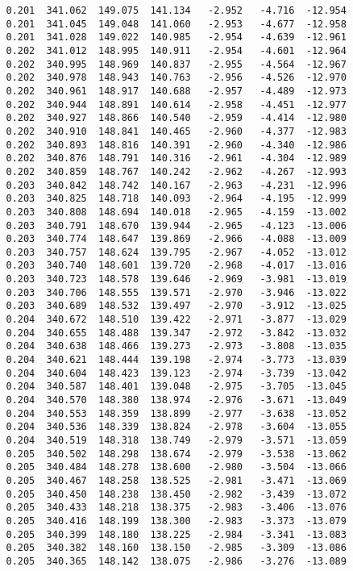 \begin{verbatim}
   0.201  341.062  149.075  141.134   -2.952   -4.716  -12.954
   0.201  341.045  149.048  141.060   -2.953   -4.677  -12.958
   0.201  341.028  149.022  140.985   -2.954   -4.639  -12.961
   0.202  341.012  148.995  140.911   -2.954   -4.601  -12.964
   0.202  340.995  148.969  140.837   -2.955   -4.564  -12.967
   0.202  340.978  148.943  140.763   -2.956   -4.526  -12.970
   0.202  340.961  148.917  140.688   -2.957   -4.489  -12.973
   0.202  340.944  148.891  140.614   -2.958   -4.451  -12.977
   0.202  340.927  148.866  140.540   -2.959   -4.414  -12.980
   0.202  340.910  148.841  140.465   -2.960   -4.377  -12.983
   0.202  340.893  148.816  140.391   -2.960   -4.340  -12.986
   0.202  340.876  148.791  140.316   -2.961   -4.304  -12.989
   0.202  340.859  148.767  140.242   -2.962   -4.267  -12.993
   0.203  340.842  148.742  140.167   -2.963   -4.231  -12.996
   0.203  340.825  148.718  140.093   -2.964   -4.195  -12.999
   0.203  340.808  148.694  140.018   -2.965   -4.159  -13.002
   0.203  340.791  148.670  139.944   -2.965   -4.123  -13.006
   0.203  340.774  148.647  139.869   -2.966   -4.088  -13.009
   0.203  340.757  148.624  139.795   -2.967   -4.052  -13.012
   0.203  340.740  148.601  139.720   -2.968   -4.017  -13.016
   0.203  340.723  148.578  139.646   -2.969   -3.981  -13.019
   0.203  340.706  148.555  139.571   -2.970   -3.946  -13.022
   0.203  340.689  148.532  139.497   -2.970   -3.912  -13.025
   0.204  340.672  148.510  139.422   -2.971   -3.877  -13.029
   0.204  340.655  148.488  139.347   -2.972   -3.842  -13.032
   0.204  340.638  148.466  139.273   -2.973   -3.808  -13.035
   0.204  340.621  148.444  139.198   -2.974   -3.773  -13.039
   0.204  340.604  148.423  139.123   -2.974   -3.739  -13.042
   0.204  340.587  148.401  139.048   -2.975   -3.705  -13.045
   0.204  340.570  148.380  138.974   -2.976   -3.671  -13.049
   0.204  340.553  148.359  138.899   -2.977   -3.638  -13.052
   0.204  340.536  148.339  138.824   -2.978   -3.604  -13.055
   0.204  340.519  148.318  138.749   -2.979   -3.571  -13.059
   0.205  340.502  148.298  138.674   -2.979   -3.538  -13.062
   0.205  340.484  148.278  138.600   -2.980   -3.504  -13.066
   0.205  340.467  148.258  138.525   -2.981   -3.471  -13.069
   0.205  340.450  148.238  138.450   -2.982   -3.439  -13.072
   0.205  340.433  148.218  138.375   -2.983   -3.406  -13.076
   0.205  340.416  148.199  138.300   -2.983   -3.373  -13.079
   0.205  340.399  148.180  138.225   -2.984   -3.341  -13.083
   0.205  340.382  148.160  138.150   -2.985   -3.309  -13.086
   0.205  340.365  148.142  138.075   -2.986   -3.276  -13.089

\end{verbatim}
